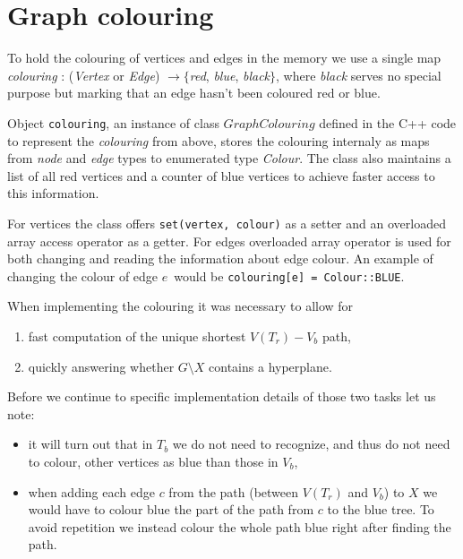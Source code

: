 \section{Graph colouring}
\label{sec:colouring}

To hold the colouring of vertices and edges in the memory we use a single map \textit{colouring} : (\textit{Vertex} or \textit{Edge}) $\rightarrow \{$\textit{red}, \textit{blue}, \textit{black}$\}$, where \textit{black} serves no special purpose but marking that an edge hasn't been coloured red or blue.

Object \lstinline|colouring|, an instance of class $GraphColouring$ defined in the C++ code to represent the \textit{colouring} from above, stores the colouring internaly as maps from \textit{node} and \textit{edge} types to enumerated type \textit{Colour}. The class also maintains a list of all red vertices and a counter of blue vertices to achieve faster access to this information.

For vertices the class offers \lstinline|set(vertex, colour)| as a setter and an overloaded array access operator as a getter. For edges overloaded array operator is used for both changing and reading the information about edge colour. An example of changing the colour of edge $e$~would be \lstinline|colouring[e] = Colour::BLUE|.

When implementing the colouring it was necessary to allow for

\begin{enumerate}
	\item fast computation of the unique shortest $V(T_r){-}V_b$ path,
	\item quickly answering whether $G \setminus X$ contains a hyperplane.
\end{enumerate}

Before we continue to specific implementation details of those two tasks let us note:

\begin{itemize}
	\item it will turn out that in $T_b$ we do not need to recognize, and thus do not need to colour, other vertices as blue than those in $V_b$,

	\item when adding each edge $c$ from the path (between $V(T_r)$ and $V_b$) to $X$ we would have to colour blue the part of the path from $c$ to the blue tree. To avoid repetition we instead colour the whole path blue right after finding the path.
\end{itemize}


